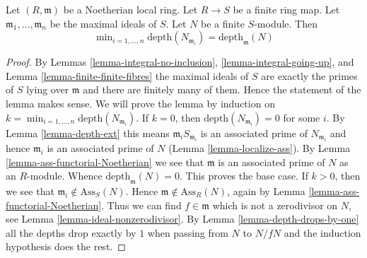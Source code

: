 \begin{lemma}
\label{lemma-depth-goes-down-finite}
Let $(R, \mathfrak m)$ be a Noetherian local ring. Let $R \to S$
be a finite ring map. Let $\mathfrak m_1, \ldots, \mathfrak m_n$
be the maximal ideals of $S$. Let $N$ be a finite $S$-module.
Then
$$
\min\nolimits_{i = 1, \ldots, n} \text{depth}(N_{\mathfrak m_i}) =
\text{depth}_\mathfrak m(N)
$$
\end{lemma}

\begin{proof}
By Lemmas \ref{lemma-integral-no-inclusion}, \ref{lemma-integral-going-up},
and Lemma \ref{lemma-finite-finite-fibres} the maximal ideals of
$S$ are exactly the primes of $S$ lying over $\mathfrak m$ and
there are finitely many of them. Hence the statement of the lemma
makes sense. We will prove the lemma by induction on
$k = \min\nolimits_{i = 1, \ldots, n} \text{depth}(N_{\mathfrak m_i})$.
If $k = 0$, then $\text{depth}(N_{\mathfrak m_i}) = 0$ for some $i$.
By Lemma \ref{lemma-depth-ext} this means
$\mathfrak m_i S_{\mathfrak m_i}$ is an associated prime
of $N_{\mathfrak m_i}$ and hence $\mathfrak m_i$ is an
associated prime of $N$ (Lemma \ref{lemma-localize-ass}).
By Lemma \ref{lemma-ass-functorial-Noetherian} we see that
$\mathfrak m$ is an associated prime of $N$ as an $R$-module.
Whence $\text{depth}_\mathfrak m(N) = 0$. This proves the base case.
If $k > 0$, then we see that $\mathfrak m_i \not \in \text{Ass}_S(N)$.
Hence $\mathfrak m \not \in \text{Ass}_R(N)$, again by
Lemma \ref{lemma-ass-functorial-Noetherian}.
Thus we can find $f \in \mathfrak m$ which is not a zerodivisor on
$N$, see Lemma \ref{lemma-ideal-nonzerodivisor}. By
Lemma \ref{lemma-depth-drops-by-one}
all the depths drop exactly by $1$ when passing from $N$ to
$N/fN$ and the induction hypothesis does the rest.
\end{proof}




